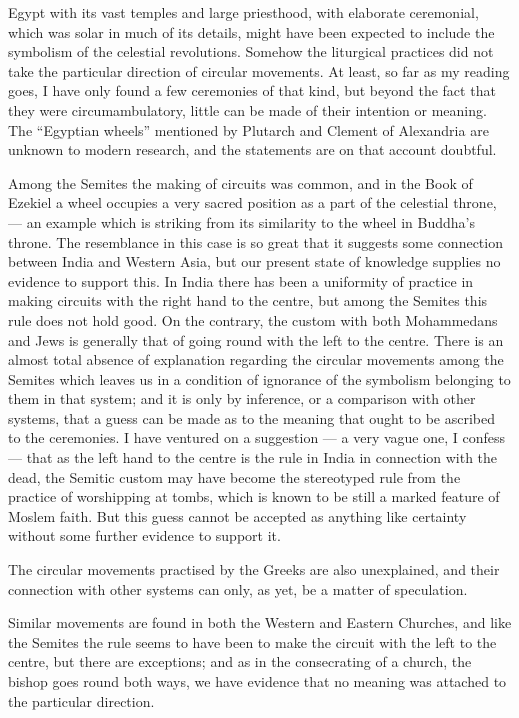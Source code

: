 \documentclass[a4paper, 11pt, oneside, polutonikogreek, english]{article}
\begin{document}
Egypt with its vast temples and large priesthood, with elaborate ceremonial, which was solar in much of its details, might have been expected to include the symbolism of the celestial revolutions. Somehow the liturgical practices did not take the particular direction of circular movements. At least, so far as my reading goes, I have only found a few ceremonies of that kind, but beyond the fact that they were circumambulatory, little can be made of their intention or meaning. The ``Egyptian wheels'' mentioned by Plutarch and Clement of Alexandria are unknown to modern research, and the statements are on that account doubtful.

Among the Semites the making of circuits was common, and in the Book of Ezekiel a wheel occupies a very sacred position as a part of the celestial throne, --- an example which is striking from its similarity to the wheel in Buddha's throne. The resemblance in this case is so great that it suggests some connection between India and Western Asia, but our present state of knowledge supplies no evidence to support this. In India there has been a uniformity of practice in making circuits with the right hand to the centre, but among the Semites this rule does not hold good. On the contrary, the custom with both Mohammedans and Jews is generally that of going round with the left to the centre. There is an almost total absence of explanation regarding the circular movements among the Semites which leaves us in a condition of ignorance of the symbolism belonging to them in that system; and it is only by inference, or a comparison with other systems, that a guess can be made as to the meaning that ought to be ascribed to the ceremonies. I have ventured on a suggestion --- a very vague one, I confess --- that as the left hand to the centre is the rule in India in connection with the dead, the Semitic custom may have become the stereotyped rule from the practice of worshipping at tombs, which is known to be still a marked feature of Moslem faith. But this guess cannot be accepted as anything like certainty without some further evidence to support it.

The circular movements practised by the Greeks are also unexplained, and their connection with other systems can only, as yet, be a matter of speculation.

Similar movements are found in both the Western and Eastern Churches, and like the Semites the rule seems to have been to make the circuit with the left to the centre, but there are exceptions; and as in the consecrating of a church, the bishop goes round both ways, we have evidence that no meaning was attached to the particular direction.
\end{document}
